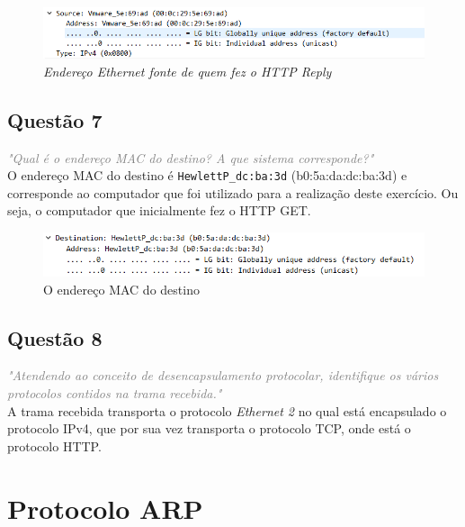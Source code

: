 \documentclass{llncs}
\newcommand{\questionE}[1]{\textcolor{gray}{\textit{"#1"}}}
\begin{document}
\begin{figure}[H]
\begin{center}
\includegraphics[width=12cm]{6.PNG}
\end{center}
\caption{\textit{Endereço Ethernet fonte de quem fez o HTTP Reply}}
\end{figure}

\clearpage

\subsection{Questão 7}
\hspace{3mm}
\questionE{Qual	é o endereço MAC do destino? A que sistema corresponde?}\\

O endereço MAC do destino é \verb|HewlettP_dc:ba:3d| (b0:5a:da:dc:ba:3d) e corresponde ao computador que foi utilizado para a realização deste exercício. Ou seja, o computador que inicialmente fez o HTTP GET.

\begin{figure}[H]
\begin{center}
\includegraphics[width=12cm]{7.PNG}
\end{center}
\caption{O endereço MAC do destino}
\end{figure}

\subsection{Questão 8}
\hspace{3mm}
\questionE{Atendendo ao conceito de desencapsulamento protocolar, identifique os vários protocolos contidos na trama recebida.}\\

A trama recebida transporta o protocolo \textit{Ethernet 2} no qual está encapsulado o protocolo IPv4, que por sua vez transporta o protocolo TCP, onde está o protocolo HTTP.

\clearpage

\section{Protocolo ARP}
\end{document}
